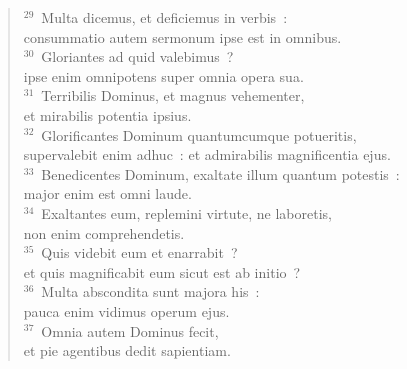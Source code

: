 \begin{verse}${}^{29}$~Multa dicemus, et deficiemus in verbis~:\\ consummatio autem sermonum ipse est in omnibus.\\
${}^{30}$~Gloriantes ad quid valebimus~?\\ ipse enim omnipotens super omnia opera sua.\\
${}^{31}$~Terribilis Dominus, et magnus vehementer,\\ et mirabilis potentia ipsius.\\
${}^{32}$~Glorificantes Dominum quantumcumque potueritis,\\ supervalebit enim adhuc~: et admirabilis magnificentia ejus.\\
${}^{33}$~Benedicentes Dominum, exaltate illum quantum potestis~:\\ major enim est omni laude.\\
${}^{34}$~Exaltantes eum, replemini virtute, ne laboretis,\\ non enim comprehendetis.\\
${}^{35}$~Quis videbit eum et enarrabit~?\\ et quis magnificabit eum sicut est ab initio~?\\
${}^{36}$~Multa abscondita sunt majora his~:\\ pauca enim vidimus operum ejus.\\
${}^{37}$~Omnia autem Dominus fecit,\\ et pie agentibus dedit sapientiam.\end{verse}



